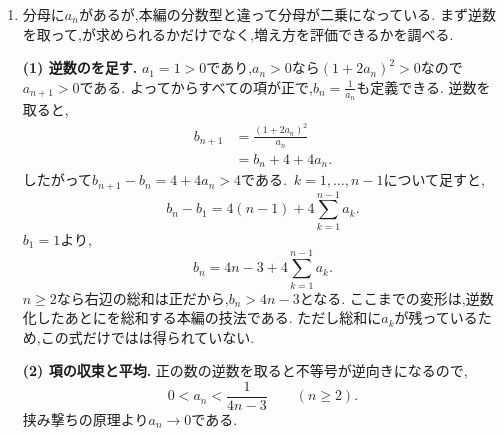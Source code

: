 \begin{enumerate}[label=\textbf{問\arabic*.},leftmargin=3.8em,format=\bookitemlink{practice-entrance}{solution}{problem}]
\[                 \begin{aligned}
                 V&=\left[\frac{\theta}{3\cos^3\theta}\right]_0^{\frac{\pi}{3}}
                      -\frac13I_3-(I_3-I_1)\\
                  &=\frac{8\pi}{9}-\frac43I_3+I_1\\
                  &=\frac{8\pi}{9}-\frac{4\sqrt3}{3}
                      +\frac13\log(2+\sqrt3).
                 \end{aligned}
                \]
                断面の半径と切断位置の関係を角度で表すと,最初に調べた$I_3$が自然に現れた.
                積分のはだけの技法ではなく,図形から生まれる積分を計算するためにも使える.
          \item 分母に$a_n$があるが,本編の分数型と違って分母が二乗になっている.
                まず逆数を取って,が求められるかだけでなく,増え方を評価できるかを調べる.
                \par\noindent
                \textbf{(1) 逆数のを足す.}
                $a_1=1>0$であり,$a_n>0$なら$(1+2a_n)^2>0$なので$a_{n+1}>0$である.
                よってからすべての項が正で,$\displaystyle b_n=\frac{1}{a_n}$も定義できる.
                逆数を取ると,
                \[
                 \begin{aligned}
                 b_{n+1}&=\frac{(1+2a_n)^2}{a_n}\\
                         &=b_n+4+4a_n.
                 \end{aligned}
                \]
                したがって$b_{n+1}-b_n=4+4a_n>4$である.
                \,$k=1,\ldots,n-1$について足すと,
                \[
                 b_n-b_1=4(n-1)+4\sum_{k=1}^{n-1}a_k.
                \]
                $b_1=1$より,
                \[
                 b_n=4n-3+4\sum_{k=1}^{n-1}a_k.
                \]
                $n\geq2$なら右辺の総和は正だから,$b_n>4n-3$となる.
                ここまでの変形は,逆数化したあとにを総和する本編の技法である.
                ただし総和に$a_k$が残っているため,この式だけではは得られていない.
                \par\noindent
                \textbf{(2) 項の収束と平均.}
                正の数の逆数を取ると不等号が逆向きになるので,
                \[
                 0<a_n<\frac1{4n-3}\qquad(n\geq2).
                \]
                挟み撃ちの原理より$a_n\to0$である.

\end{enumerate}
